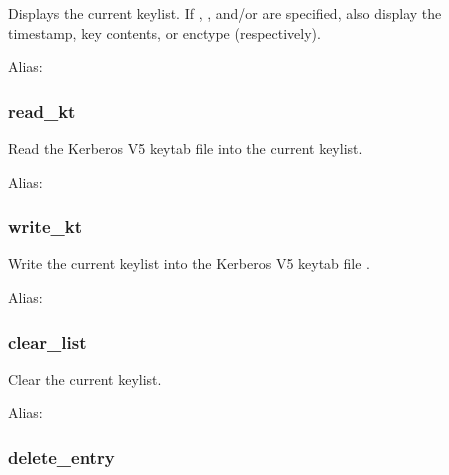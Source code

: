 \documentclass[letterpaper,10pt,english]{sphinxmanual}
\begin{document}
\sphinxAtStartPar
Displays the current keylist.  If , , and/or  are
specified, also display the timestamp, key contents, or enctype
(respectively).

\sphinxAtStartPar
Alias: 


\subsubsection{read\_kt}
\label{\detokenize{admin/admin_commands/ktutil:read-kt}}\begin{quote}

\sphinxAtStartPar
{} 
\end{quote}

\sphinxAtStartPar
Read the Kerberos V5 keytab file  into the current keylist.

\sphinxAtStartPar
Alias: 


\subsubsection{write\_kt}
\label{\detokenize{admin/admin_commands/ktutil:write-kt}}\begin{quote}

\sphinxAtStartPar
{} 
\end{quote}

\sphinxAtStartPar
Write the current keylist into the Kerberos V5 keytab file .

\sphinxAtStartPar
Alias: 


\subsubsection{clear\_list}
\label{\detokenize{admin/admin_commands/ktutil:clear-list}}\begin{quote}

\sphinxAtStartPar
{}
\end{quote}

\sphinxAtStartPar
Clear the current keylist.

\sphinxAtStartPar
Alias: 


\subsubsection{delete\_entry}
\label{\detokenize{admin/admin_commands/ktutil:delete-entry}}\begin{quote}

\sphinxAtStartPar
{} 
\end{quote}
\end{document}
